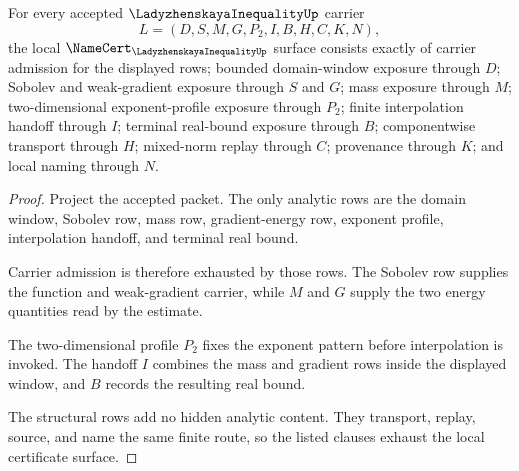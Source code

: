 \begin{theorem}
\label{thm:ladyzhenskaya-inequality-namecert-obligations}
For every accepted $\LadyzhenskayaInequalityUp$ carrier
$$
L=(D,S,M,G,P_2,I,B,H,C,K,N),
$$
the local $\NameCert_{\LadyzhenskayaInequalityUp}$ surface consists exactly of carrier admission for the displayed rows; bounded domain-window exposure through $D$; Sobolev and weak-gradient exposure through $S$ and $G$; mass exposure through $M$; two-dimensional exponent-profile exposure through $P_2$; finite interpolation handoff through $I$; terminal real-bound exposure through $B$; componentwise transport through $H$; mixed-norm replay through $C$; provenance through $K$; and local naming through $N$.
\end{theorem}
\begin{proof}
Project the accepted packet. The only analytic rows are the domain window, Sobolev row, mass row, gradient-energy row, exponent profile, interpolation handoff, and terminal real bound.

Carrier admission is therefore exhausted by those rows. The Sobolev row supplies the function and weak-gradient carrier, while $M$ and $G$ supply the two energy quantities read by the estimate.

The two-dimensional profile $P_2$ fixes the exponent pattern before interpolation is invoked. The handoff $I$ combines the mass and gradient rows inside the displayed window, and $B$ records the resulting real bound.

The structural rows add no hidden analytic content. They transport, replay, source, and name the same finite route, so the listed clauses exhaust the local certificate surface.
\end{proof}

